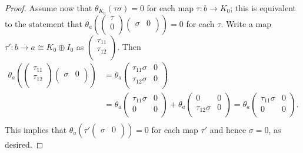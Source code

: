 \begin{proof}
Assume now that $\theta_{K_0}(\tau \sigma )=0$ for each map $\tau :b\to K_0$; this is equivalent to the statement that $\theta_a\left ( \left (\begin{smallmatrix} \tau \\ 0 \\ \end{smallmatrix}\right )\left (\begin{smallmatrix} \sigma & 0 \\ \end{smallmatrix}\right )\right )=0$ for each $\tau$. Write a map $\tau':b\to a\cong K_0\oplus I_0$ as $\left (\begin{smallmatrix} \tau_{11} \\ \tau_{12} \\ \end{smallmatrix}\right )$. Then
$$
\begin{aligned}
\theta_a\left ( \left (\begin{smallmatrix} \tau_{11} \\ \tau_{12} \\ \end{smallmatrix}\right )\left (\begin{smallmatrix} \sigma & 0 \\ \end{smallmatrix}\right )\right ) &= \theta_a \left (\begin{smallmatrix} \tau_{11}\sigma & 0 \\ \tau_{12}\sigma & 0 \\ \end{smallmatrix}\right ) \\
                                  &= \theta_a \left (\begin{smallmatrix} \tau_{11}\sigma & 0 \\ 0 & 0 \\ \end{smallmatrix}\right )+\theta_a \left (\begin{smallmatrix} 0 & 0 \\ \tau_{12}\sigma & 0 \\ \end{smallmatrix}\right ) = \theta_a \left (\begin{smallmatrix} \tau_{11}\sigma & 0 \\ 0 & 0 \\ \end{smallmatrix}\right ). \\
\end{aligned}
$$
This implies that $\theta_a\left (\tau'\left (\begin{smallmatrix} \sigma & 0 \\ \end{smallmatrix}\right ) \right )=0$ for each map $\tau'$ and hence $\sigma=0$, as desired.
\end{proof}

